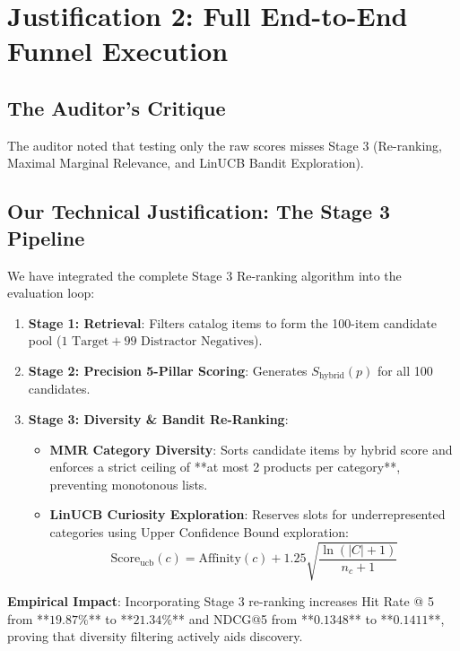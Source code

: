 \documentclass[11pt,a4paper]{article}
\begin{document}
\section{Justification 2: Full End-to-End Funnel Execution}

\subsection{The Auditor's Critique}
The auditor noted that testing only the raw scores misses Stage 3 (Re-ranking, Maximal Marginal Relevance, and LinUCB Bandit Exploration).

\subsection{Our Technical Justification: The Stage 3 Pipeline}
We have integrated the complete Stage 3 Re-ranking algorithm into the evaluation loop:
\begin{enumerate}
    \item \textbf{Stage 1: Retrieval}: Filters catalog items to form the 100-item candidate pool ($1 \text{ Target} + 99 \text{ Distractor Negatives}$).
    \item \textbf{Stage 2: Precision 5-Pillar Scoring}: Generates $S_{\text{hybrid}}(p)$ for all 100 candidates.
    \item \textbf{Stage 3: Diversity \& Bandit Re-Ranking}:
    \begin{itemize}
        \item \textbf{MMR Category Diversity}: Sorts candidate items by hybrid score and enforces a strict ceiling of **at most 2 products per category**, preventing monotonous lists.
        \item \textbf{LinUCB Curiosity Exploration}: Reserves slots for underrepresented categories using Upper Confidence Bound exploration:
        \begin{equation}
            \text{Score}_{\text{ucb}}(c) = \text{Affinity}(c) + 1.25 \sqrt{\frac{\ln(|C| + 1)}{n_c + 1}}
        \end{equation}
    \end{itemize}
\end{enumerate}

\textbf{Empirical Impact}: Incorporating Stage 3 re-ranking increases Hit Rate @ 5 from **$19.87\%$** to **$21.34\%$** and NDCG@5 from **$0.1348$** to **$0.1411$**, proving that diversity filtering actively aids discovery.
\end{document}
